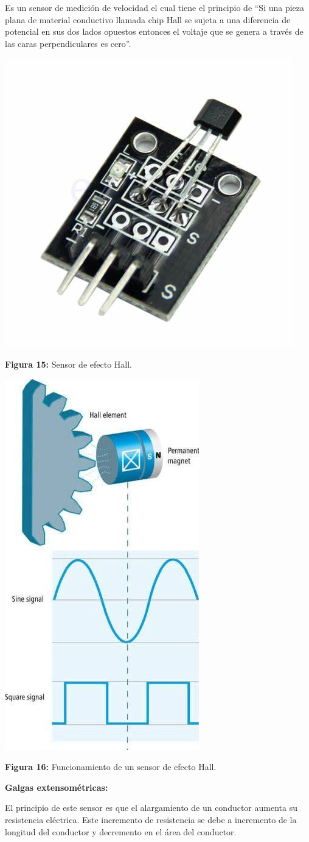 Es un sensor de medición de velocidad el cual tiene el principio de “Si una pieza plana de material conductivo llamada chip Hall se sujeta a una diferencia de potencial en sus dos lados opuestos entonces el voltaje que se genera a través de las caras perpendiculares es cero”.

\vspace{5mm}

\begin{center}
	\includegraphics[width=0.1\linewidth, height=0.1\textheight]{img/HALL}
	
	\vspace{2mm} %
	
	\textbf{Figura 15:} Sensor de efecto Hall.
\end{center}

\vspace{5mm} %

\begin{center}
	\includegraphics[width=0.3\linewidth]{img/Shall}
	
	\vspace{2mm} %
	
	\textbf{Figura 16:} Funcionamiento de un sensor de efecto Hall.
\end{center}


\vspace{10mm}
\textbf{Galgas extensométricas:}

El principio de este sensor es que el alargamiento de un conductor aumenta su resistencia eléctrica. Este incremento de resistencia se debe a incremento de la longitud del conductor y decremento en el área del conductor.

